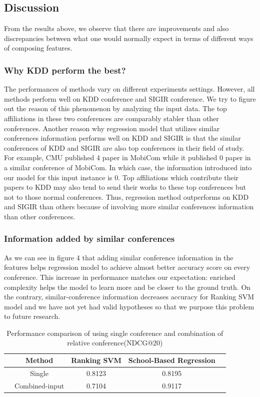 \documentclass[letterpaper]{article}
\begin{document}
\subsection{Discussion}
From the results above, we observe that there are improvements and also discrepancies between what one would normally expect in terms of different ways of composing features.

\subsubsection{Why KDD perform the best?}
The performances of methods vary on different experiments settings. However, all methods perform well on KDD conference and SIGIR conference. We try to figure out the reason of this phenomenon by analyzing the input data. The top affiliations in these two conferences are comparably stabler than other conferences. Another reason why regression model that utilizes similar conferences information performs well on KDD and SIGIR is that the similar conferences of KDD and SIGIR are also top conferences in their field of study. For example, CMU published 4 paper in MobiCom while it published 0 paper in a similar conference of MobiCom. In which case, the information introduced into our model for this input instance is 0. Top affiliations which contribute their papers to KDD may also tend to send their works to these top conferences but not to those normal conferences. Thus, regression method outperforms on KDD and SIGIR than others because of involving more similar conferences information than other conferences.

\subsubsection{Information added by similar conferences}
As we can see in figure 4 that adding similar conference information in the features helps regression model to achieve almost better accuracy score on every conference. This increase in performance matches our expectation: enriched complexity helps the model to learn more and be closer to the ground truth. On the contrary, similar-conference information decreases accuracy for Ranking SVM model and we have not yet had valid hypotheses so that we purpose this problem to future research.

\begin{table}[htbp]
\centering\scriptsize
\caption{Performance comparison of using single conference and combination of relative conference(NDCG@20)}
    \begin{tabular}{ccccc}
    \hline
          & Method& Ranking SVM & School-Based Regression\\
    \hline
     
        &Single& 0.8123& 0.8195\\
        &Combined-input& 0.7104& 0.9117\\
    \hline
\end{tabular}%
\end{table}%
\end{document}
